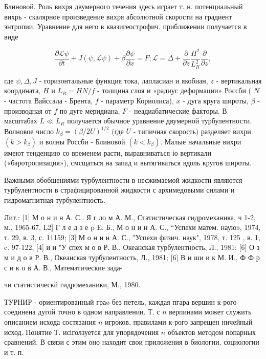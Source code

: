 \documentclass[10pt]{article}
\begin{document}
Блиновой. Роль вихря двумерного течения здесь играет т. н. потенциальный вихрь - скалярное произведение вихря абсолютной скорости на градиент энтропии. Уравнение для него в квазигеострофич. приближении получается в виде



\[

\frac{\partial \mathscr{L} \psi}{\partial t}+J(\psi, \mathscr{L} \psi)+\beta \frac{\partial \psi}{\partial x}=F ; \mathscr{L}=\Delta+\frac{\partial}{\partial z} \frac{H^{2}}{L_{R}^{2}} \frac{\partial}{\partial z},

\]



где $\psi, \Delta, J$ - горизонтальные функция тока, лапласиан и якобиан, $z$ - вертикальная координата, $H$ и $L_{R}=H N / f$ - толщина слоя и «радиус деформации» Россби ( $N$ - частота Вайссала - Брента, $f$ - параметр Кориолиса), $x$ - дуга круга широты, $\beta$ - производная от $f$ по дуге меридиана, $F$ - неадиабатические факторы. В масштабах $L \ll L_{R}$ получается обычное уравнение двумерной турбулентности. Волновое число $k_{\beta}=(\beta / 2 U)^{1 / 2}$ (где $U$ - типичная скорость) разделяет вихри $\left(k>k_{\beta}\right)$ и волны Россби - Блиновой $\left(k<k_{\beta}\right)$. Малые начальные вихри имеют тенденцию со временем расти, выравниваться іо вертикали («баротропизация»), смсщаться на запад и вытягиваться вдоль кругов широты.



Важными обобщениями турбулентности в несжимаемой жидкости являются турбулентности в страфицированной жидкости с архимедовыми силами и гидромагнитная турбулентность.



Лит.: [1] М о н и н А. С., Я г ло м А. М., Статистическая гидромеханика, ч 1-2, м., 1965-67, L2] Г л е д з е p E. Б., М о н и н А. С., “Успехи матем. наую», 1974, т. 29, в. 3, с. 11159; [3] М о н и н А. С., "Успехи физич. наук", 1978, т. 125 , в. 1, c. 97-122, [4] и и "У спех м о в Р. В., Океанская турбулентность, Л., 1981; [6] О з м и д о в Р. В., Океанская турбулентность, Л., 1981; [6] В и ши и к М. И., Ф Ф р с и к о в А. В., Математические зада-

чи статистическй гидромеханики, М., 1980.



ТУРНИР - ориентированный граø без петель, каждая пгара вершин к-рого соединена дугой точно в одном направлении. Т. с $n$ верпинами может служить описанием исхода состязания $n$ игроков, правилами к-рого запрещен ничейный исход. Понятие Т. исіголзуется для упорядочения $n$ объектов методом попарных сравнений. В связи с этим оно находит свои приложения в биологии, социологии и т. п.
\end{document}
